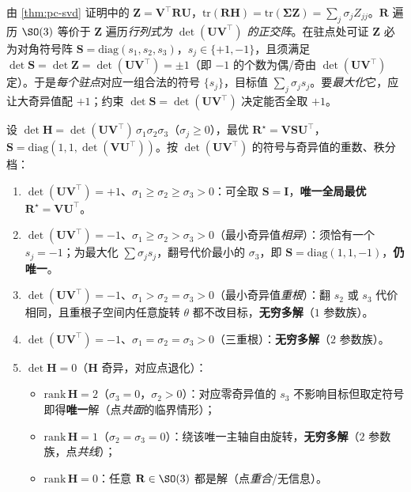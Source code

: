 \begin{derivation}
由 \cref{thm:pc-svd} 证明中的 $\mathbf{Z}=\mathbf{V}^\top\mathbf{R}\mathbf{U}$，$\mathrm{tr}(\mathbf{R}\mathbf{H})=\mathrm{tr}(\boldsymbol{\Sigma}\mathbf{Z})=\sum_j\sigma_j Z_{jj}$。$\mathbf{R}$ 遍历 $\SO(3)$ 等价于 $\mathbf{Z}$ 遍历\emph{行列式为 $\det(\mathbf{U}\mathbf{V}^\top)$ 的正交阵}。在驻点处可证 $\mathbf{Z}$ 必为对角符号阵 $\mathbf{S}=\mathrm{diag}(s_1,s_2,s_3)$，$s_j\in\{+1,-1\}$，且须满足 $\det\mathbf{S}=\det\mathbf{Z}=\det(\mathbf{U}\mathbf{V}^\top)=\pm1$（即 $-1$ 的个数为偶/奇由 $\det(\mathbf{U}\mathbf{V}^\top)$ 定）。于是\emph{每个驻点}对应一组合法的符号 $\{s_j\}$，目标值 $\sum_j\sigma_j s_j$。要\emph{最大化}它，应让大奇异值配 $+1$；约束 $\det\mathbf{S}=\det(\mathbf{U}\mathbf{V}^\top)$ 决定能否全取 $+1$。
\end{derivation}

\begin{theorem}\label{thm:pc-wahba-cases}
设 $\det\mathbf{H}=\det(\mathbf{U}\mathbf{V}^\top)\,\sigma_1\sigma_2\sigma_3$（$\sigma_j\ge0$），最优 $\mathbf{R}^\star=\mathbf{V}\mathbf{S}\mathbf{U}^\top$，$\mathbf{S}=\mathrm{diag}(1,1,\det(\mathbf{V}\mathbf{U}^\top))$。按 $\det(\mathbf{U}\mathbf{V}^\top)$ 的符号与奇异值的重数、秩分档：
\begin{enumerate}
  \item[\textbf{(i-a)}] $\det(\mathbf{U}\mathbf{V}^\top)=+1$、$\sigma_1\ge\sigma_2\ge\sigma_3>0$：可全取 $\mathbf{S}=\mathbf{I}$，\textbf{唯一全局最优} $\mathbf{R}^\star=\mathbf{V}\mathbf{U}^\top$。
  \item[\textbf{(i-b)}] $\det(\mathbf{U}\mathbf{V}^\top)=-1$、$\sigma_1\ge\sigma_2>\sigma_3>0$（最小奇异值\emph{相异}）：须恰有一个 $s_j=-1$；为最大化 $\sum\sigma_j s_j$，翻号代价最小的 $\sigma_3$，即 $\mathbf{S}=\mathrm{diag}(1,1,-1)$，\textbf{仍唯一}。
  \item[\textbf{(i-c)}] $\det(\mathbf{U}\mathbf{V}^\top)=-1$、$\sigma_1>\sigma_2=\sigma_3>0$（最小奇异值\emph{重根}）：翻 $s_2$ 或 $s_3$ 代价相同，且重根子空间内任意旋转 $\theta$ 都不改目标，\textbf{无穷多解}（$1$ 参数族）。
  \item[\textbf{(i-d)}] $\det(\mathbf{U}\mathbf{V}^\top)=-1$、$\sigma_1=\sigma_2=\sigma_3>0$（三重根）：\textbf{无穷多解}（$2$ 参数族）。
  \item[\textbf{(ii)}] $\det\mathbf{H}=0$（$\mathbf{H}$ 奇异，对应点退化）：
  \begin{itemize}
    \item $\mathrm{rank}\,\mathbf{H}=2$（$\sigma_3=0$，$\sigma_2>0$）：对应零奇异值的 $s_3$ 不影响目标但取定符号即得\textbf{唯一}解（点\emph{共面}的临界情形）；
    \item $\mathrm{rank}\,\mathbf{H}=1$（$\sigma_2=\sigma_3=0$）：绕该唯一主轴自由旋转，\textbf{无穷多解}（$2$ 参数族，点\emph{共线}）；
    \item $\mathrm{rank}\,\mathbf{H}=0$：任意 $\mathbf{R}\in\SO(3)$ 都是解（点\emph{重合}/无信息）。
  \end{itemize}
\end{enumerate}
\end{theorem}

